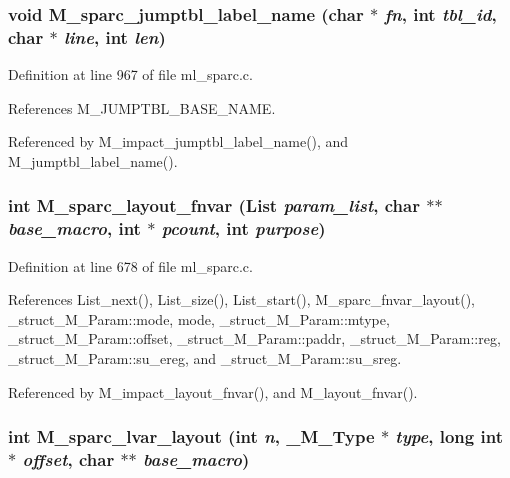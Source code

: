 \subsubsection{\setlength{\rightskip}{0pt plus 5cm}void M\_\-sparc\_\-jumptbl\_\-label\_\-name (char $\ast$ {\em fn}, int {\em tbl\_\-id}, char $\ast$ {\em line}, int {\em len})}\label{ml__sparc_8c_a8bb4786c5a281d43408eeca343f3280}




Definition at line 967 of file ml\_\-sparc.c.

References M\_\-JUMPTBL\_\-BASE\_\-NAME.

Referenced by M\_\-impact\_\-jumptbl\_\-label\_\-name(), and M\_\-jumptbl\_\-label\_\-name().
\subsubsection{\setlength{\rightskip}{0pt plus 5cm}int M\_\-sparc\_\-layout\_\-fnvar (\bf{List} {\em param\_\-list}, char $\ast$$\ast$ {\em base\_\-macro}, int $\ast$ {\em pcount}, int {\em purpose})}\label{ml__sparc_8c_e27149bd41448ad4d7b1f6d8d16e84a5}




Definition at line 678 of file ml\_\-sparc.c.

References List\_\-next(), List\_\-size(), List\_\-start(), M\_\-sparc\_\-fnvar\_\-layout(), \_\-struct\_\-M\_\-Param::mode, mode, \_\-struct\_\-M\_\-Param::mtype, \_\-struct\_\-M\_\-Param::offset, \_\-struct\_\-M\_\-Param::paddr, \_\-struct\_\-M\_\-Param::reg, \_\-struct\_\-M\_\-Param::su\_\-ereg, and \_\-struct\_\-M\_\-Param::su\_\-sreg.

Referenced by M\_\-impact\_\-layout\_\-fnvar(), and M\_\-layout\_\-fnvar().
\subsubsection{\setlength{\rightskip}{0pt plus 5cm}int M\_\-sparc\_\-lvar\_\-layout (int {\em n}, \bf{\_\-M\_\-Type} $\ast$ {\em type}, long int $\ast$ {\em offset}, char $\ast$$\ast$ {\em base\_\-macro})}\label{ml__sparc_8c_ff238cf52516106ab0e2bd5c56f374f3}




